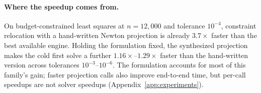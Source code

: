 \paragraph{Where the speedup comes from.}
On budget-constrained least squares at $n=12{,}000$ and tolerance $10^{-4}$,
constraint relocation with a hand-written Newton projection is already
$3.7\times$ faster than the best available engine. Holding the formulation
fixed, the synthesized projection makes the cold first solve a further
$1.16\times$--$1.29\times$ faster than the hand-written version across
tolerances $10^{-3}$--$10^{-6}$. The formulation accounts for most of this
family's gain; faster projection calls also improve end-to-end time, but
per-call speedups are not solver speedups (Appendix~\ref{app:experiments}).
